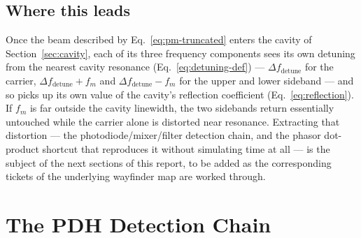 \documentclass[9pt]{article}
\begin{document}
\subsection{Where this leads}
\label{sec:sidebands-next}
Once the beam described by Eq.~\eqref{eq:pm-truncated} enters the cavity of
Section~\ref{sec:cavity}, each of its three frequency components sees its own
detuning from the nearest cavity resonance (Eq.~\eqref{eq:detuning-def}) ---
$\Delta f_{\mathrm{detune}}$ for the carrier, $\Delta f_{\mathrm{detune}} + f_m$
and $\Delta f_{\mathrm{detune}} - f_m$ for the upper and lower sideband --- and
so picks up its own value of the cavity's reflection coefficient
(Eq.~\eqref{eq:reflection}). If $f_m$ is far outside the cavity linewidth, the
two sidebands return
essentially untouched while the carrier alone is distorted near resonance.
Extracting that distortion --- the photodiode/mixer/filter detection chain,
and the phasor dot-product shortcut that reproduces it without simulating
time at all --- is the subject of the next sections of this report, to be
added as the corresponding tickets of the underlying wayfinder map are
worked through.

\section{The PDH Detection Chain}
\label{sec:pdh-detection}
\end{document}
